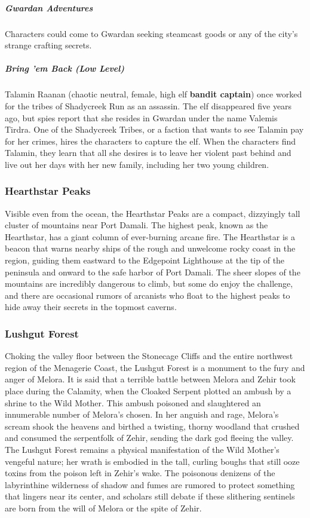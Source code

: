 \documentclass[10pt,a4paper,twoside,bg=print,twocolumn,openany,nodeprecatedcode]{dndbook}
\begin{document}
\subparagraph{Gwardan Adventures}
Characters could come to Gwardan seeking steamcast goods or any of the city's strange crafting secrets.

\subparagraph{Bring 'em Back (Low Level)}
Talamin Raanan (chaotic neutral, female, high elf \textbf{bandit captain}) once worked for the tribes of Shadycreek Run as an assassin. The elf disappeared five years ago, but spies report that she resides in Gwardan under the name Valemis Tirdra. One of the Shadycreek Tribes, or a faction that wants to see Talamin pay for her crimes, hires the characters to capture the elf. When the characters find Talamin, they learn that all she desires is to leave her violent past behind and live out her days with her new family, including her two young children.

\subsubsection{Hearthstar Peaks}
Visible even from the ocean, the Hearthstar Peaks are a compact, dizzyingly tall cluster of mountains near Port Damali. The highest peak, known as the Hearthstar, has a giant column of ever-burning arcane fire. The Hearthstar is a beacon that warns nearby ships of the rough and unwelcome rocky coast in the region, guiding them eastward to the Edgepoint Lighthouse at the tip of the peninsula and onward to the safe harbor of Port Damali. The sheer slopes of the mountains are incredibly dangerous to climb, but some do enjoy the challenge, and there are occasional rumors of arcanists who float to the highest peaks to hide away their secrets in the topmost caverns.

\subsubsection{Lushgut Forest}
Choking the valley floor between the Stonecage Cliffs and the entire northwest region of the Menagerie Coast, the Lushgut Forest is a monument to the fury and anger of Melora. It is said that a terrible battle between Melora and Zehir took place during the Calamity, when the Cloaked Serpent plotted an ambush by a shrine to the Wild Mother. This ambush poisoned and slaughtered an innumerable number of Melora's chosen. In her anguish and rage, Melora's scream shook the heavens and birthed a twisting, thorny woodland that crushed and consumed the serpentfolk of Zehir, sending the dark god fleeing the valley. The Lushgut Forest remains a physical manifestation of the Wild Mother's vengeful nature; her wrath is embodied in the tall, curling boughs that still ooze toxins from the poison left in Zehir's wake. The poisonous denizens of the labyrinthine wilderness of shadow and fumes are rumored to protect something that lingers near its center, and scholars still debate if these slithering sentinels are born from the will of Melora or the spite of Zehir.
\end{document}
